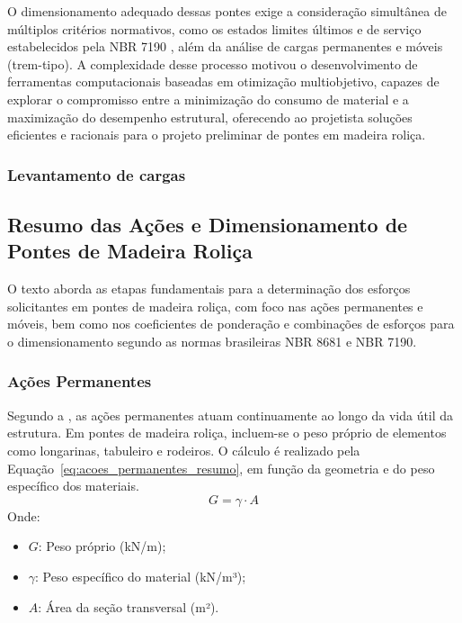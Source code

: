 O dimensionamento adequado dessas pontes exige a consideração simultânea de múltiplos critérios normativos, como os estados limites últimos e de serviço estabelecidos pela NBR 7190 \cite{NBR7190-1:2022}, além da análise de cargas permanentes e móveis (trem-tipo). A complexidade desse processo motivou o desenvolvimento de ferramentas computacionais baseadas em otimização multiobjetivo, capazes de explorar o compromisso entre a minimização do consumo de material e a maximização do desempenho estrutural, oferecendo ao projetista soluções eficientes e racionais para o projeto preliminar de pontes em madeira roliça.



\subsubsection{Levantamento de cargas}

\subsection*{Resumo das Ações e Dimensionamento de Pontes de Madeira Roliça}

O texto aborda as etapas fundamentais para a determinação dos esforços solicitantes em pontes de madeira roliça, com foco nas ações permanentes e móveis, bem como nos coeficientes de ponderação e combinações de esforços para o dimensionamento segundo as normas brasileiras NBR 8681 e NBR 7190.

\subsubsection*{Ações Permanentes}
Segundo a \textcite{NBR8681:2025}, as ações permanentes atuam continuamente ao longo da vida útil da estrutura. Em pontes de madeira roliça, incluem-se o peso próprio de elementos como longarinas, tabuleiro e rodeiros. O cálculo é realizado pela Equação~\eqref{eq:acoes_permanentes_resumo}, em função da geometria e do peso específico dos materiais.
\begin{equation}
G = \gamma \cdot A
\label{eq:acoes_permanentes_resumo}
\end{equation}
Onde:
\begin{itemize}
    \item $G$: Peso próprio (kN/m);
    \item $\gamma$: Peso específico do material (kN/m³);
    \item $A$: Área da seção transversal (m²).
\end{itemize}

